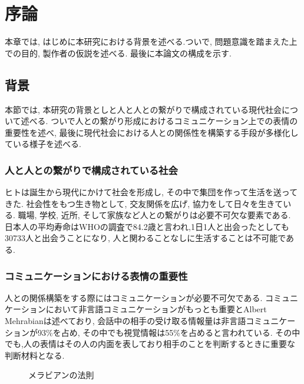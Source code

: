 \chapter{序論}
\label{chap:introduction}

本章では, はじめに本研究における背景を述べる.ついで, 問題意識を踏まえた上での目的, 製作者の仮説を述べる. 最後に本論文の構成を示す.

\section{背景}
本節では, 本研究の背景としと人と人との繋がりで構成されている現代社会について述べる. ついで人との繋がり形成におけるコミュニケーション上での表情の重要性を述べ, 最後に現代社会における人との関係性を構築する手段が多様化している様子を述べる.


\subsection{人と人との繋がりで構成されている社会}
ヒトは誕生から現代にかけて社会を形成し, その中で集団を作って生活を送ってきた. 社会性をもつ生き物として, 交友関係を広げ, 協力をして日々を生きている. 職場, 学校, 近所, そして家族など人との繋がりは必要不可欠な要素である. 日本人の平均寿命はWHOの調査で84.2歳\cite{WHO_reserch}と言われ,1日1人と出会ったとしても30733人と出会うことになり, 人と関わることなしに生活することは不可能である.
\subsection{コミュニケーションにおける表情の重要性}
人との関係構築をする際にはコミュニケーションが必要不可欠である. コミュニケーションにおいて非言語コミュニケーションがもっとも重要とAlbert Mehrabian\cite{rule_of_Mehrabian}は述べており, 会話中の相手の受け取る情報量は非言語コミュニケーションが93\%を占め, その中でも視覚情報は55\%を占めると言われている. その中でも,人の表情はその人の内面を表しており相手のことを判断するときに重要な判断材料となる.
\begin{figure}[htbp]
    \begin{center}
    \end{center}
    \caption{メラビアンの法則}
    \label{fig:mehrabian}
\end{figure}


